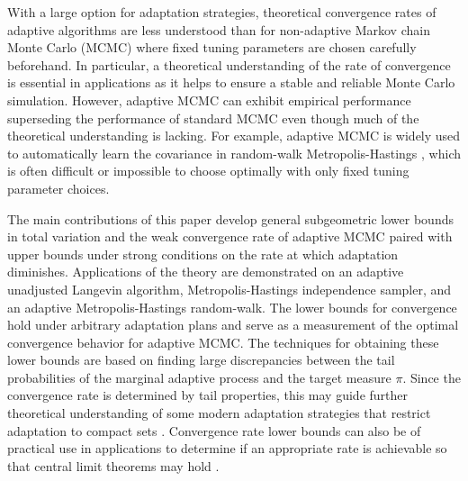 \documentclass[12pt]{article}
\theoremstyle{plain}
\theoremstyle{remark}
\begin{document}
With a large option for adaptation strategies, theoretical convergence rates of adaptive algorithms are less understood than for non-adaptive Markov chain Monte Carlo (MCMC) where fixed tuning parameters are chosen carefully beforehand.
In particular, a theoretical understanding of the rate of convergence is essential in applications as it helps to ensure a stable and reliable Monte Carlo simulation.
However, adaptive MCMC can exhibit empirical performance superseding the performance of standard MCMC even though much of the theoretical understanding is lacking.
For example, adaptive MCMC is widely used to automatically learn the covariance in random-walk Metropolis-Hastings \citep{haario:2001}, which is often difficult or impossible to choose optimally with only fixed tuning parameter choices. 

The main contributions of this paper develop general subgeometric lower bounds in total variation and the weak convergence rate of adaptive MCMC paired with upper bounds under strong conditions on the rate at which adaptation diminishes.
Applications of the theory are demonstrated on an adaptive unadjusted Langevin algorithm, Metropolis-Hastings independence sampler, and an adaptive Metropolis-Hastings random-walk.
The lower bounds for convergence hold under arbitrary adaptation plans and serve as a measurement of the optimal convergence behavior for adaptive MCMC.
The techniques for obtaining these lower bounds are based on finding large discrepancies between the tail probabilities of the marginal adaptive process and the target measure $\pi$.
Since the convergence rate is determined by tail properties, this may guide further theoretical understanding of some modern adaptation strategies that restrict adaptation to compact sets \citep{pompe:etal:2020}.
Convergence rate lower bounds can also be of practical use in applications to determine if an appropriate rate is achievable so that central limit theorems may hold \citep{andrieu:moulines:2006, laitinen:vihola:2024}.
\end{document}
